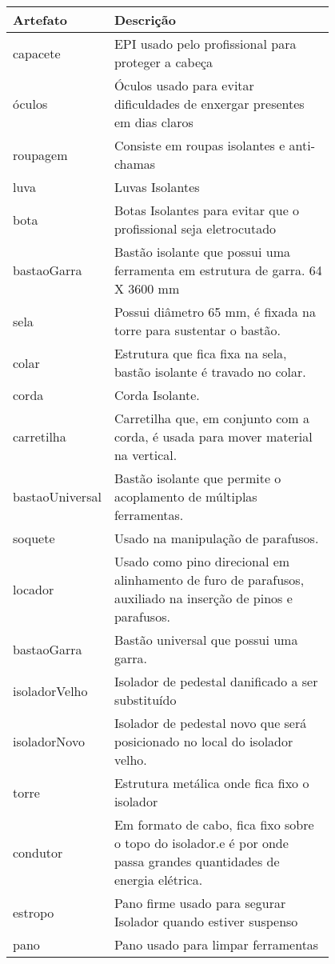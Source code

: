 \begin{table}[H]
\centering
\begin{tabular}{|l|p{0.8\linewidth}|}
\hline
\textbf{Artefato} & \textbf{Descrição} \\ \hline
capacete & EPI usado pelo profissional para proteger a cabeça \\ \hline
óculos & Óculos usado para evitar dificuldades de enxergar presentes em dias claros \\ \hline
roupagem & Consiste em roupas isolantes e anti-chamas \\ \hline
luva & Luvas Isolantes \\ \hline
bota & Botas Isolantes para evitar que o profissional seja eletrocutado \\ \hline
bastaoGarra & Bastão isolante que possui uma ferramenta em estrutura de garra. 64 X 3600 mm \\ \hline
sela & Possui diâmetro 65 mm, é fixada na torre para sustentar o bastão. \\ \hline
colar & Estrutura que fica fixa na sela, bastão isolante é travado no colar. \\ \hline
corda & Corda Isolante. \\ \hline
carretilha & Carretilha que, em conjunto com a corda, é usada para mover material na vertical. \\ \hline
bastaoUniversal & Bastão isolante que permite o acoplamento de múltiplas ferramentas. \\ \hline
soquete & Usado na manipulação de parafusos. \\ \hline
locador & Usado como pino direcional em alinhamento de furo de parafusos, auxiliado na inserção de pinos e parafusos. \\ \hline
bastaoGarra & Bastão universal que possui uma garra. \\ \hline
isoladorVelho & Isolador de pedestal danificado a ser substituído \\ \hline
isoladorNovo & Isolador de pedestal novo que será posicionado no local do isolador velho. \\ \hline
torre & Estrutura metálica onde fica fixo o isolador \\ \hline
condutor & Em formato de cabo, fica fixo sobre o topo do isolador.e é por onde passa grandes quantidades de energia elétrica. \\ \hline
estropo & Pano firme usado para segurar Isolador quando estiver suspenso \\ \hline
pano & Pano usado para limpar ferramentas \\ \hline

\end{tabular}
\end{table}
